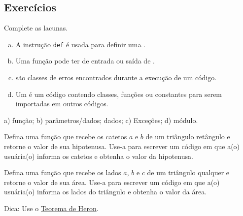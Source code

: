 \subsection{Exercícios}


\begin{exer}
  Complete as lacunas.
  \begin{enumerate}[a)]
    \item A instrução \texttt{def} é usada para definir uma \underline{\phantom{função}}.
    \item Uma função pode ter \underline{\phantom{parâmetros}} de entrada ou saída de \underline{\phantom{dados}}.
    \item \underline{\phantom{Exceções}} são classes de erros encontrados durante a execução de um código.
    \item Um \underline{\phantom{módulo}} é um código {\python} contendo classes, funções ou constantes para serem importadas em outros códigos.
  \end{enumerate}
\end{exer}
\begin{resp}
  a) função; b) parâmetros/dados; dados; c) Exceções; d) módulo.
\end{resp}


\begin{exer}
  Defina uma função que recebe os catetos $a$ e $b$ de um triângulo retângulo e retorne o valor de sua hipotenusa. Use-a para escrever um código em que a(o) usuária(o) informa os catetos e obtenha o valor da hipotenusa.
\end{exer}

\begin{exer}
  Defina uma função que recebe os lados $a$, $b$ e $c$ de um triângulo qualquer e retorne o valor de sua área. Use-a para escrever um código em que a(o) usuária(o) informa os lados do triângulo e obtenha o valor da área.  
\end{exer}
\begin{resp}
  Dica: Use o \href{https://pt.wikipedia.org/wiki/Teorema\_de\_Her\%C3\%A3o}{Teorema de Heron}.
\end{resp}

